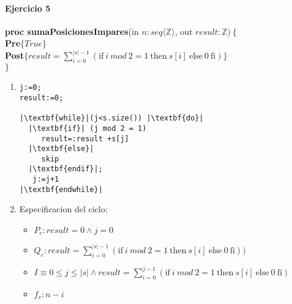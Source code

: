 \documentclass{article}
\begin{document}
\paragraph{Ejercicio 5\\}
\noindent
\textbf{proc sumaPosicionesImpares}(in $n: seq\langle\mathbb{Z}\rangle$, out $result: \mathbb{Z})\ \{$\smallskip \\
\hspace*{6mm}\textbf{Pre}$\{True \}$\\
\hspace*{6mm}\textbf{Post}$\{ result=\sum_{i=0}^{|s|-1}(\textrm{if}\ i\ mod\ 2=1\ \textrm{then}\ s[i]\ \textrm{else}\ 0\ \textrm{fi})\}$\\
$\}$\medskip\\

\noindent
\begin{enumerate}[label=\alph*)]
	\item 

\begin{lstlisting}
j:=0;
result:=0;

|\textbf{while}|(j<s.size()) |\textbf{do}|
  |\textbf{if}| (j mod 2 = 1) 
     result=:result +s[j]
  |\textbf{else}|
     skip
  |\textbf{endif}|;
   j:=j+1
|\textbf{endwhile}|
\end{lstlisting}
	\item
	
 Especificacion del ciclo:
	\begin{itemize}
		\item $P_c: result=0 \wedge j=0$
		\item $Q_c: result=\sum_{i=0}^{|s|-1}(\textrm{if}\ i\ mod\ 2=1\ \textrm{then}\ s[i]\ \textrm{else}\ 0\ \textrm{fi}))$
		\item $I\equiv 0\leq j\leq |s| \wedge result=\sum_{i=0}^{j-1}(\textrm{if}\ i\ mod\ 2=1\ \textrm{then}\ s[i]\ \textrm{else}\ 0\ \textrm{fi})$
		\item $f_v:n-i$
	\end{itemize}
	

\end{enumerate}
\end{document}
